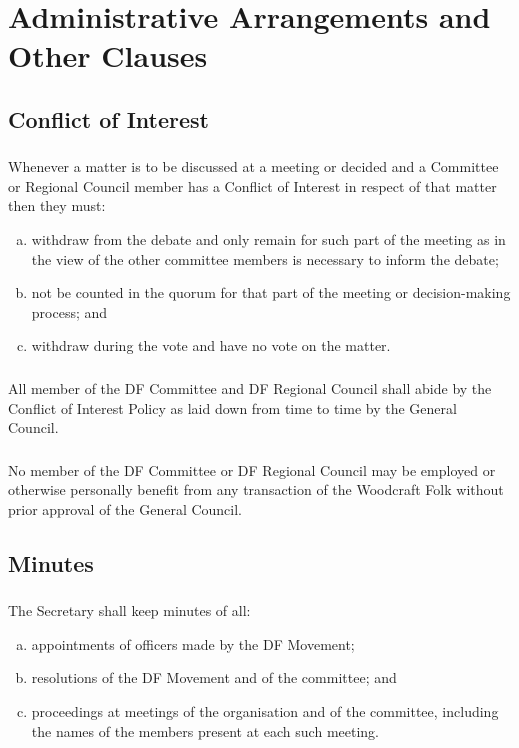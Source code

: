 \documentclass[a4paper, 12pt]{report}
\begin{document}
\section{Administrative Arrangements and Other Clauses}
\label{sec:admin}
\subsection{Conflict of Interest}
\subsubsection{}
Whenever a matter is to be discussed at a meeting or decided and a Committee or Regional Council member has a Conflict of Interest in respect of that matter then they must:
\begin{enumerate}[(a)]
\item withdraw from the debate and only remain for such part of the meeting as in the view of the other committee members is necessary to inform the debate;
\item not be counted in the quorum for that part of the meeting or decision-making process; and
\item withdraw during the vote and have no vote on the matter.
\end{enumerate}
\subsubsection{}
All member of the DF Committee and DF Regional Council shall abide by the Conflict of Interest Policy as laid down from time to time by the General Council.
\subsubsection{}
No member of the DF Committee or DF Regional Council may be employed or otherwise personally benefit from any transaction of the Woodcraft Folk without prior approval of the General Council.

\subsection{Minutes}
\subsubsection{}
The Secretary shall keep minutes of all:
\begin{enumerate}[(a)]
\item appointments of officers made by the DF Movement;
\item resolutions of the DF Movement and of the committee; and
\item proceedings at meetings of the organisation and of the committee, including the names of the members present at each such meeting.
\end{enumerate}
\end{document}
